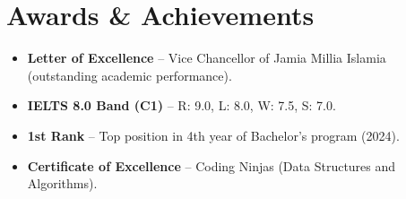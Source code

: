 \documentclass[a4paper,11pt]{article}
\newcommand{\cvitem}[1]{\item\small{#1}}
\newenvironment{cvitemlist}
  {\begin{itemize}[leftmargin=0.4cm, topsep=1pt, itemsep=0pt, parsep=0pt, label=\textbullet]}
  {\end{itemize}}
\begin{document}
\section{Awards \& Achievements}

\begin{cvitemlist}
  \cvitem{\textbf{Letter of Excellence} -- Vice Chancellor of Jamia Millia Islamia (outstanding academic performance).}
  \cvitem{\textbf{IELTS 8.0 Band (C1)} -- R: 9.0, L: 8.0, W: 7.5, S: 7.0.}
  \cvitem{\textbf{1st Rank} -- Top position in 4th year of Bachelor's program (2024).}
  \cvitem{\textbf{Certificate of Excellence} -- Coding Ninjas (Data Structures and Algorithms).}
\end{cvitemlist}
\end{document}
